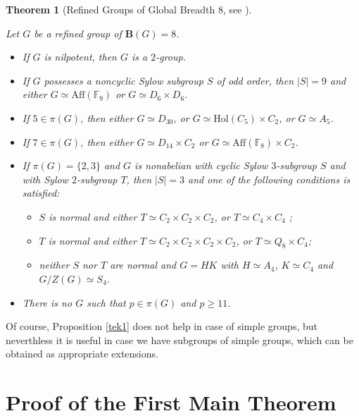 \documentclass{amsart}
\newtheorem{theorem}{Theorem}[section]
\theoremstyle{definition}
\numberwithin{equation}{section}
\begin{document}
\begin{theorem}[Refined Groups of Global Breadth 8, see \cite{hr3}] \label{classificationofbg8}

Let $G$ be a refined group of $\mathbf{B}(G) = 8$.

\begin{itemize}
\item[(i).] If $G$ is nilpotent, then $G$ is a $2$-group.

\item[(ii).] If $G$ possesses a noncyclic Sylow subgroup $S$ of odd order, then $|S| = 9$ and either $G \simeq \mathrm{Aff}(\mathbb{F}_9)$ or  $G \simeq D_6 \times D_6$.

\item[(iii).] If $5 \in \pi(G)$, then either $G \simeq D_{30}$, or $G \simeq \mathrm{Hol}(C_5) \times C_2$, or  $G \simeq A_5$.

\item[(iv).] If $7 \in \pi(G)$, then either $G \simeq D_{14} \times C_2$ or $G \simeq \mathrm{Aff}(\mathbb{F}_8) \times C_2$.

\item[(v).] If $\pi(G)=\{2,3\}$ and $G$ is nonabelian with  cyclic Sylow $3$-subgroup $S$ and with Sylow $2$-subgroup $T$, then $|S|=3$ and one of the following conditions is satisfied:
\begin{itemize}
\item[(1)]  $S$ is  normal and either  $T \simeq C_2 \times C_2 \times C_2$, or $T \simeq C_4 \times C_4$ ;
\item[(2)]$T$ is normal and either  $T \simeq C_2 \times C_2 \times C_2 \times C_2$, or  $T \simeq Q_8 \times C_4$;
\item[(3)] neither $S$ nor $T$  are  normal and $G=HK$ with $H \simeq A_4$,  $K \simeq C_4$ and $G/Z(G) \simeq S_4$.
\end{itemize}

\item[(vi).] There is no $G$ such that $p \in \pi(G)$ and $p \ge 11$.
\end{itemize}


\end{theorem}

Of course, Proposition \ref{tek1} does not help in case of simple groups, but neverthless it is useful in case we have subgroups of simple groups, which can be obtained as appropriate extensions.

\section{Proof of the First Main Theorem}
\end{document}
